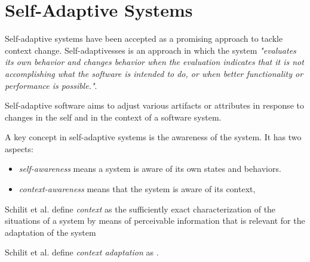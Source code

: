 \section{Self-Adaptive Systems}

Self-adaptive systems have been accepted as a promising approach to tackle context change. Self-adaptivesses is an approach in which the system
\textit{"evaluates its own behavior and changes behavior when the evaluation indicates that it is not accomplishing what the software is intended to do, or when better functionality or performance is possible."}\cite{laddaga_self_1997}.

Self-adaptive software aims to adjust various artifacts or attributes in response to changes in the self and in the context of a software system\cite{salehie_self-adaptive_2009}.

A key concept in self-adaptive systems is the awareness of the system. It has two aspects\cite{salehie_self-adaptive_2009}:
\begin{itemize}
   \item \textit{self-awareness} means a system is aware of its own states and behaviors.
   \item \textit{context-awareness} means that the system is aware of its context,
\end{itemize}

Schilit et al.\cite{klein_survey_2008} define \textit{context} as the sufficiently exact characterization of the situations of a system by means of perceivable information that is relevant for the adaptation of the system

Schilit et al.\cite{klein_survey_2008} define \textit{context adaptation} as .









